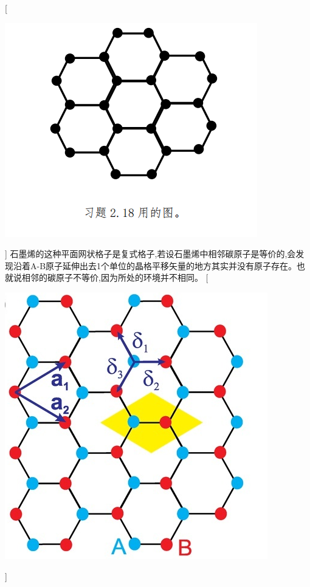 \documentclass[UTF8,12pt, a4paper, oneside]{ctexart}
\begin{document}
    [ \begin{center} \includegraphics{picture/2-19-1.png}\end{center}]
    {石墨烯的这种平面网状格子是复式格子,若设石墨烯中相邻碳原子是等价的,会发现沿着A-B原子延伸出去1个单位的晶格平移矢量的地方其实并没有原子存在。也就说相邻的碳原子不等价,因为所处的环境并不相同。}
    [ \begin{center}\includegraphics{picture/2-19-2.png} \end{center}]
        
\end{document}
